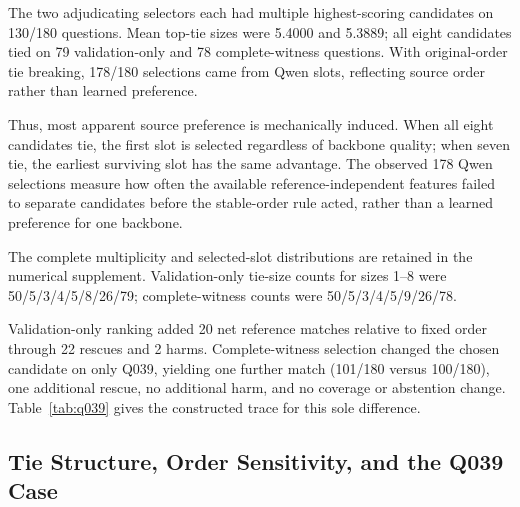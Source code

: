 \documentclass[applsci,article,submit,moreauthors]{Definitions/mdpi}
\begin{document}
The two adjudicating selectors each had multiple highest-scoring candidates on 130/180 questions. Mean top-tie sizes were 5.4000 and 5.3889; all eight candidates tied on 79 validation-only and 78 complete-witness questions. With original-order tie breaking, 178/180 selections came from Qwen slots, reflecting source order rather than learned preference.

Thus, most apparent source preference is mechanically induced. When all eight candidates tie, the first slot is selected regardless of backbone quality; when seven tie, the earliest surviving slot has the same advantage. The observed 178 Qwen selections measure how often the available reference-independent features failed to separate candidates before the stable-order rule acted, rather than a learned preference for one backbone.

The complete multiplicity and selected-slot distributions are retained in the numerical supplement. Validation-only tie-size counts for sizes 1--8 were 50/5/3/4/5/8/26/79; complete-witness counts were 50/5/3/4/5/9/26/78.

Validation-only ranking added 20 net reference matches relative to fixed order through 22 rescues and 2 harms. Complete-witness selection changed the chosen candidate on only Q039, yielding one further match (101/180 versus 100/180), one additional rescue, no additional harm, and no coverage or abstention change. Table~\ref{tab:q039} gives the constructed trace for this sole difference.

\subsection{Tie Structure, Order Sensitivity, and the Q039 Case}
\end{document}
